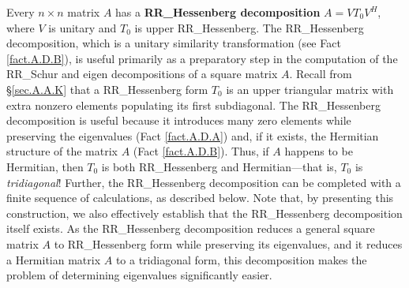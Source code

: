 Every $n\times n$ matrix $A$ has a {\bf RR_Hessenberg decomposition} $A=V
T_0 V^{H}$, where $V$ is unitary and $T_0$ is upper RR_Hessenberg.  The
RR_Hessenberg decomposition, which is a unitary similarity transformation (see Fact \ref{fact.A.D.B}), is useful primarily as a preparatory
step in the computation of the RR_Schur and eigen decompositions of
a square matrix $A$.  Recall from \S \ref{sec.A.A.K} that a
RR_Hessenberg form $T_0$ is an upper triangular matrix with extra
nonzero elements populating its first subdiagonal.  The RR_Hessenberg
decomposition is useful because it introduces many zero elements while
preserving the eigenvalues (Fact \ref{fact.A.D.A}) and, if it exists,
the Hermitian structure of the matrix $A$ (Fact \ref{fact.A.D.B}).
Thus, if $A$ happens to be Hermitian, then $T_0$ is both RR_Hessenberg
and Hermitian---that is, $T_0$ is {\it tridiagonal\/}!  Further, the
RR_Hessenberg decomposition can be completed with a finite
sequence of calculations, as described below.  Note that, by
presenting this construction, we also effectively establish that the
RR_Hessenberg decomposition itself exists.  As the RR_Hessenberg
decomposition reduces a general square matrix $A$ to RR_Hessenberg form while preserving its eigenvalues, and it reduces a Hermitian
matrix $A$ to a tridiagonal form, this decomposition makes the problem of determining eigenvalues significantly easier.

\begin{figure*}[t]
\end{figure*}

